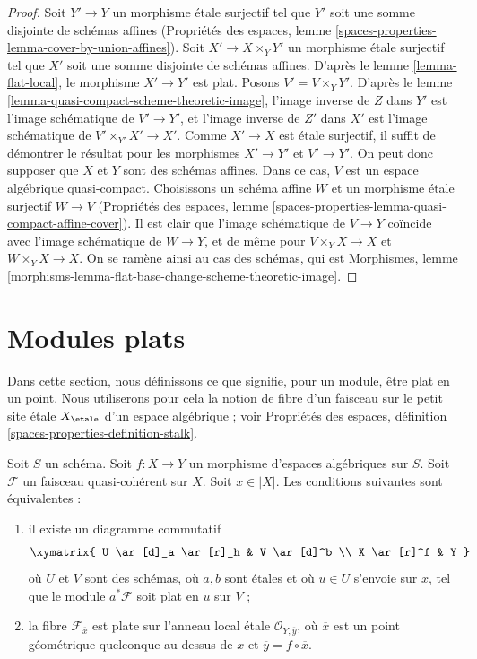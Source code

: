 \begin{proof}
Soit $Y' \to Y$ un morphisme étale surjectif tel que $Y'$ soit une
somme disjointe de schémas affines (Propriétés des espaces,
lemme \ref{spaces-properties-lemma-cover-by-union-affines}).
Soit $X' \to X \times_Y Y'$ un morphisme étale surjectif tel
que $X'$ soit une somme disjointe de schémas affines.
D'après le lemme \ref{lemma-flat-local}, le morphisme $X' \to Y'$ est plat.
Posons $V' = V \times_Y Y'$.
D'après le lemme \ref{lemma-quasi-compact-scheme-theoretic-image},
l'image inverse de $Z$ dans $Y'$ est l'image schématique
de $V' \to Y'$, et l'image inverse de $Z'$ dans $X'$
est l'image schématique de $V' \times_{Y'} X' \to X'$.
Comme $X' \to X$ est étale surjectif, il suffit de démontrer
le résultat pour les morphismes $X' \to Y'$ et $V' \to Y'$.
On peut donc supposer que $X$ et $Y$ sont des schémas affines.
Dans ce cas, $V$ est un espace algébrique quasi-compact.
Choisissons un schéma affine $W$ et un morphisme étale surjectif
$W \to V$ (Propriétés des espaces, lemme
\ref{spaces-properties-lemma-quasi-compact-affine-cover}).
Il est clair que l'image schématique de $V \to Y$
coïncide avec l'image schématique de $W \to Y$, et
de même pour $V \times_Y X \to X$ et $W \times_Y X \to X$.
On se ramène ainsi au cas des schémas, qui est
Morphismes, lemme
\ref{morphisms-lemma-flat-base-change-scheme-theoretic-image}.
\end{proof}





\section{Modules plats}
\label{section-flat-modules}

\noindent
Dans cette section, nous définissons ce que signifie, pour un module, être plat
en un point. Nous utiliserons pour cela la notion de fibre d'un faisceau sur
le petit site étale $X_\etale$ d'un espace algébrique ; voir
Propriétés des espaces, définition \ref{spaces-properties-definition-stalk}.

\begin{lemma}
\label{lemma-flat-at-point}
Soit $S$ un schéma. Soit $f : X \to Y$ un morphisme d'espaces
algébriques sur $S$. Soit $\mathcal{F}$ un faisceau quasi-cohérent sur $X$.
Soit $x \in |X|$. Les conditions suivantes sont équivalentes :
\begin{enumerate}
\item il existe un diagramme commutatif
$$
\xymatrix{
U \ar[d]_a \ar[r]_h & V \ar[d]^b \\
X \ar[r]^f & Y
}
$$
où $U$ et $V$ sont des schémas, où $a, b$ sont étales et où
$u \in U$ s'envoie sur $x$, tel que le module $a^*\mathcal{F}$ soit plat en $u$ sur $V$ ;
\item la fibre $\mathcal{F}_{\overline{x}}$ est plate sur
l'anneau local étale $\mathcal{O}_{Y, \overline{y}}$,
où $\overline{x}$ est un point géométrique quelconque au-dessus de
$x$ et $\overline{y} = f \circ \overline{x}$.
\end{enumerate}
\end{lemma}

